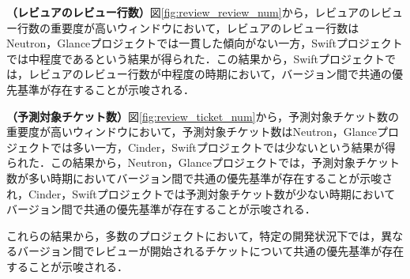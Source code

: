 \documentclass[11pt]{jreport}
\begin{document}
\textbf{（レビュアのレビュー行数）}図\ref{fig:review_review_num}から，レビュアのレビュー行数の重要度が高いウィンドウにおいて，レビュアのレビュー行数はNeutron，Glanceプロジェクトでは一貫した傾向がない一方，Swiftプロジェクトでは中程度であるという結果が得られた．この結果から，Swiftプロジェクトでは，レビュアのレビュー行数が中程度の時期において，バージョン間で共通の優先基準が存在することが示唆される．

\textbf{（予測対象チケット数）}図\ref{fig:review_ticket_num}から，予測対象チケット数の重要度が高いウィンドウにおいて，予測対象チケット数はNeutron，Glanceプロジェクトでは多い一方，Cinder，Swiftプロジェクトでは少ないという結果が得られた．この結果から，Neutron，Glanceプロジェクトでは，予測対象チケット数が多い時期においてバージョン間で共通の優先基準が存在することが示唆され，Cinder，Swiftプロジェクトでは予測対象チケット数が少ない時期においてバージョン間で共通の優先基準が存在することが示唆される．

これらの結果から，多数のプロジェクトにおいて，特定の開発状況下では，異なるバージョン間でレビューが開始されるチケットについて共通の優先基準が存在することが示唆される．


\begin{table}[t]
\caption{提案モデルのみで正例と正しく判別したチケットの予測で重要度の高い説明変数と重要度}
\label{table:review_importance_propose_only_p}
\centering
\vspace{0.5zh}
\end{table}
\end{document}
